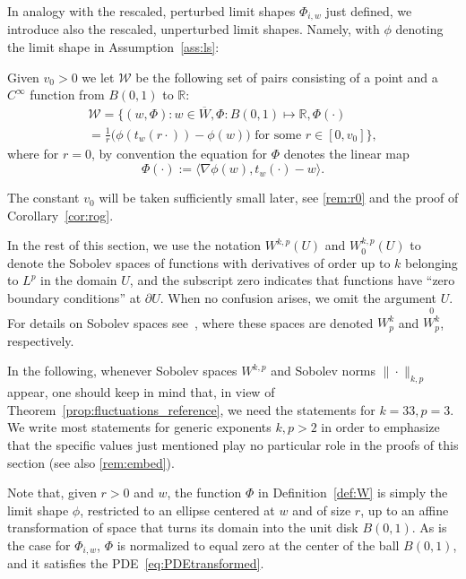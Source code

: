 \documentclass[AHL,Unicode,longabstracts,published]{cedram}
\newcommand{\R}{\mathbb{R}}
\newcommand{\clW}{\mathcal{W}}
\begin{document}
In analogy with the rescaled, perturbed limit shapes $\Phi_{i,w}$ just defined, we introduce also the rescaled, unperturbed limit shapes. Namely, with $\phi$ denoting the limit shape in
Assumption~\ref{ass:ls}:
\begin{defi}\label{def:W}
Given $v_0>0$ we let $\clW$ be the following set of pairs consisting of a point and a $C^\infty$ function from $B(0,1)$ to $\R$:
\begin{multline}
\clW =
\Big\{(w, \Phi) : w \in \overline{W}, \Phi:B(0,1)\mapsto \R, \Phi(\cdot) \\= \frac{1}{r}\big(\phi(t_w(r\cdot)) - \phi(w)\big) \text{ for some } r\in [0,v_0]\Big\},
\end{multline}
where for $r = 0$, by convention the equation for $\Phi$ denotes the linear map
\begin{equation}\label{eq:linphi}
\Phi(\cdot):=\langle \nabla \phi(w), t_w (\cdot) - w \rangle.
\end{equation}
\end{defi}

The constant $v_0$ will be taken sufficiently small later, see
\cref{rem:r0} and the proof of Corollary~\ref{cor:rog}.

\begin{rema}
In the rest of this section, we use the notation $W^{k,p}(U)$ and $W^{k,p}_0(U)$ to denote the Sobolev spaces of functions with derivatives of order up to $k$ belonging to $L^p$ in the domain $U$, and the subscript zero indicates that functions have ``zero boundary conditions'' at $\partial U$. When no confusion arises, we omit the argument $U$. For details on Sobolev spaces see~\cite[Chapt.~8]{krilov}, where these spaces are denoted $W^k_p$ and ${\stackrel 0 {W^k_p}}$, respectively.

In the following, whenever Sobolev spaces $W^{k,p}$ and Sobolev norms $\|\cdot\|_{k,p}$ appear, one should keep in mind that, in view of Theorem~\ref{prop:fluctuations_reference}, we need the statements for $k=33, p=3$. We write most statements for generic exponents $k,p>2$ in order to emphasize that the specific values just mentioned play no particular role in the proofs of this section (see also
\cref{rem:embed}).
\end{rema}

Note that, given $r>0$ and $w$, the function $\Phi$ in Definition~\ref{def:W} is simply the limit shape $\phi$, restricted to an ellipse centered at $w$ and of size $r$, up to an affine transformation of space that turns its domain into the unit disk $B(0,1)$. As is the case for $\Phi_{i,w}$, $\Phi$ is normalized to equal zero at the center of the ball $B(0,1)$, and it satisfies the PDE~\eqref{eq:PDEtransformed}.
\end{document}
